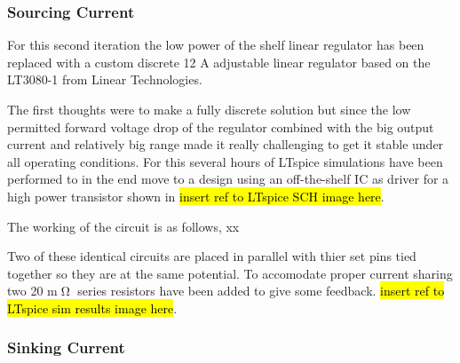 \subsubsection{Sourcing Current}
For this second iteration the low power of the shelf linear regulator has been 
replaced with a custom discrete 12 A adjustable linear regulator based on the 
LT3080-1 from Linear Technologies.

The first thoughts were to make a fully discrete solution but since the low 
permitted forward voltage drop of the regulator combined with the big output 
current and relatively big range made it really challenging to get it stable 
under all operating conditions. For this several hours of LTspice simulations 
have been performed to in the end move to a design using an off-the-shelf IC as 
driver for a high power transistor shown in \hl{insert ref to LTspice SCH image here}.

The working of the circuit is as follows, xx

Two of these identical circuits are placed in parallel with thier set pins tied 
together so they are at the same potential. To accomodate proper current sharing 
two 20 m$\tcohm$ series resistors have been added to give some feedback.
\hl{insert ref to LTspice sim results image here}.

\subsubsection{Sinking Current}

